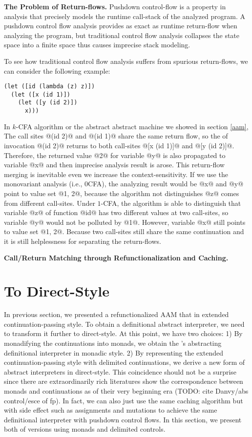 \documentclass[acmsmall,review,anonymous]{acmart}\settopmatter{printfolios=true,printccs=false,printacmref=false}
\begin{document}
\textbf{The Problem of Return-flows.}
Pushdown control-flow is a property in analysis that precisely models
the runtime call-stack of the analyzed program.
A pushdown control flow analysis provides as exact as runtime return-flow
when analyzing the program, but traditional control flow analysis collapses
the state space into a finite space thus causes imprecise stack modeling.

To see how traditional control flow analysis suffers from spurious return-flows,
we can consider the following example:

\begin{lstlisting}
(let ([id (lambda (z) z)])
  (let ([x (id 1)])
    (let ([y (id 2)])
      x)))
\end{lstlisting}

In $k$-CFA algorithm or the abstract abstract machine we showed in section
\ref{aam},
The call sites @(id 2)@ and @(id 1)@ share the same return flow,
so the of invocation @(id 2)@ returns to both call-sites @[x (id 1)]@ and @[y (id 2)]@.
Therefore, the returned value @2@ for variable @y@ is also propagated to
variable @x@ and then imprecise analysis result is arose.
This return-flow merging is inevitable even we increase the context-sensitivity.
If we use the monovariant analysis (i.e., 0CFA), the analyzing result would be @x@ and
@y@ point to value set @{1, 2}@, because the algorithm not distinguishes
@z@ comes from different call-sites.
Under $1$-CFA, the algorithm is able to distinguish that variable @z@ of function
@id@ has two different values at two call-sites, so variable @y@
would not be polluted by @1@.
However, variable @x@ still points to value set @{1, 2}@.
Because two call-sites still share the same continuation and
it is still helplessness for separating the return-flows.

\textbf{Call/Return Matching through Refunctionalization and Caching.}

\section{To Direct-Style} \label{directstyle}

In previous section, we presented a refunctionalized AAM that in extended continuation-passing style.
To obtain a definitional abstract interpreter, we need to transform it further to direct-style.
At this point, we have two choices:
1) By monadifying the continuations into monads, we obtain the \citeauthor{darais2017abstracting}'s
abstracting definitional interpreter in monadic style.
2) By representing the extended continuation-passing style with delimited continuations,
we derive a new form of abstract interpreters in direct-style.
This coincidence should not be a surprise since there are extraordinarily rich literatures
show the correspondence between monads and continuations as of their very beginning era
(TODO: cite Danvy/abs control/esce of fp).
In fact, we can also just use the same caching algorithm but with side effect such as
assignments and mutations to achieve the same definitional interpreter with pushdown
control flows.
In this section, we present both of versions using monads and delimited controls.
\end{document}
